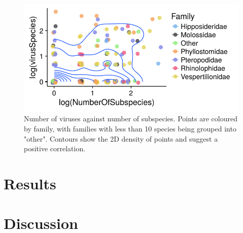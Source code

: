 \begin{knitrout}
\begin{figure}[t]
{\centering \includegraphics[width=\textwidth]{figure/subsDataFrame-1} 

}

\caption[
Number of viruses against number of subspecies]{
Number of viruses against number of subspecies.
Points are coloured by family, with families with less than 10 species being grouped into "other".
Contours show the 2D density of points and suggest a positive correlation.
}\label{fig:subsDataFrame}
\end{figure}


\end{knitrout}














\clearpage
\section{Results}











\clearpage
\section{Discussion}  








